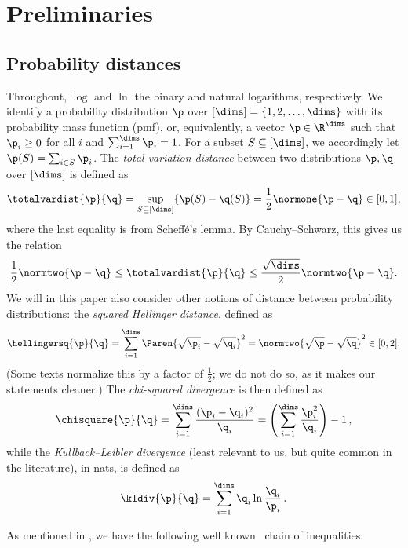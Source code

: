\documentclass[11pt]{article}
\DeclarePairedDelimiter\parens{\lparen}{\rparen}
\begin{document}
\section{Preliminaries}
  \label{sec:prelims}
%
\subsection{Probability distances}
Throughout, $\log$ and $\ln$ the binary and natural logarithms, respectively. We identify a probability distribution $\p$ over $[\dims]=\{1,2,\dots,\dims\}$ with its probability mass function (pmf), or, equivalently, a vector $\p\in\R^\dims$ such that $\p_i \geq 0$ for all $i$ and $\sum_{i=1}^\dims \p_i=1$. For a subset $S\subseteq [\dims]$, we accordingly let $\p(S) = \sum_{i\in S}\p_i$. The \emph{total variation distance} between two distributions $\p,\q$ over $[\dims]$ is defined as
\begin{equation}
  \totalvardist{\p}{\q} = \sup_{S\subseteq [\dims]} \{\p(S)-\q(S)\} = \frac{1}{2}\normone{\p-\q} \in [0,1],
\end{equation}
where the last equality is from Scheff\'e's lemma. By Cauchy--Schwarz, this gives us the relation 
\begin{equation}
  \frac{1}{2} \normtwo{\p-\q} \leq \totalvardist{\p}{\q} \leq \frac{\sqrt{\dims}}{2} \normtwo{\p-\q}.
\end{equation}
We will in this paper also consider other notions of distance between probability distributions: the \emph{squared Hellinger distance}, defined as
\begin{equation}
  \hellingersq{\p}{\q} = \sum_{i=1}^\dims \Paren{\sqrt{\p_i}-\sqrt{\q_i}}^2 = \normtwo{\sqrt{\p}-\sqrt{\q}}^2 \in [0,2].
\end{equation}
(Some texts normalize this by a factor of $\frac12$; we do not do so, as it makes our statements cleaner.) 
The \emph{chi-squared divergence} is then defined as
\begin{equation}
  \chisquare{\p}{\q} = \sum_{i=1}^\dims \frac{(\p_i-\q_i)^2}{\q_i} =\parens*{\sum_{i=1}^\dims\frac{\p_i^2}{\q_i}}-1\,,
\end{equation}
while the \emph{Kullback--Leibler divergence} (least relevant to us, but quite common in the literature), in nats, is defined as
\begin{equation}
  \kldiv{\p}{\q} = \sum_{i=1}^\dims \q_i \ln \frac{\q_i}{\p_i}\,.
\end{equation}
%

\noindent As mentioned in , we have the following well known~\cite{GS02} chain of inequalities:
\end{document}
